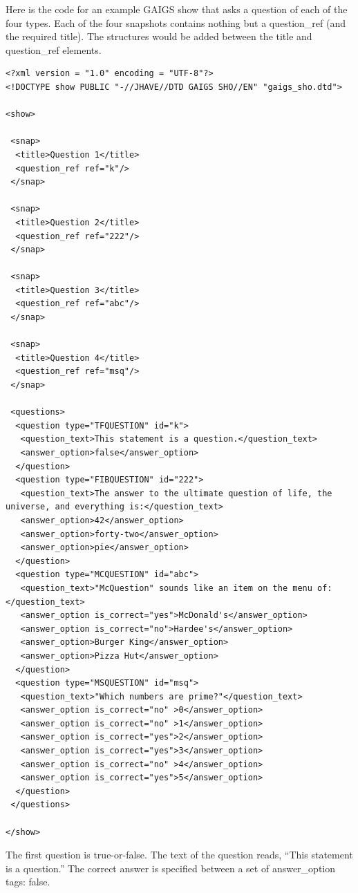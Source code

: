 \documentclass[11pt,letterpaper]{book}
\begin{document}
Here is the code for an example GAIGS show that asks a question of
each of the four types. Each of the four snapshots contains nothing
but a question\_ref (and the required title). The structures would be
added between the title and question\_ref elements.

\footnotesize \begin{verbatim}
<?xml version = "1.0" encoding = "UTF-8"?>
<!DOCTYPE show PUBLIC "-//JHAVE//DTD GAIGS SHO//EN" "gaigs_sho.dtd">

<show>

 <snap>
  <title>Question 1</title>
  <question_ref ref="k"/>
 </snap>

 <snap>
  <title>Question 2</title>
  <question_ref ref="222"/>
 </snap>

 <snap>
  <title>Question 3</title>
  <question_ref ref="abc"/>
 </snap>

 <snap>
  <title>Question 4</title>
  <question_ref ref="msq"/>
 </snap>

 <questions>
  <question type="TFQUESTION" id="k">
   <question_text>This statement is a question.</question_text>
   <answer_option>false</answer_option>
  </question>
  <question type="FIBQUESTION" id="222">
   <question_text>The answer to the ultimate question of life, the universe, and everything is:</question_text>
   <answer_option>42</answer_option>
   <answer_option>forty-two</answer_option>
   <answer_option>pie</answer_option>
  </question>
  <question type="MCQUESTION" id="abc">
   <question_text>"McQuestion" sounds like an item on the menu of:</question_text>
   <answer_option is_correct="yes">McDonald's</answer_option>
   <answer_option is_correct="no">Hardee's</answer_option>
   <answer_option>Burger King</answer_option>
   <answer_option>Pizza Hut</answer_option>
  </question>
  <question type="MSQUESTION" id="msq">
   <question_text>"Which numbers are prime?"</question_text>
   <answer_option is_correct="no" >0</answer_option>
   <answer_option is_correct="no" >1</answer_option>
   <answer_option is_correct="yes">2</answer_option>
   <answer_option is_correct="yes">3</answer_option>
   <answer_option is_correct="no" >4</answer_option>
   <answer_option is_correct="yes">5</answer_option>
  </question>
 </questions>

</show>
\end{verbatim} \normalsize


The first question is true-or-false. The text of the question reads,
``This statement is a question.'' The correct answer is specified
between a set of answer\_option tags: false. 
\end{document}
